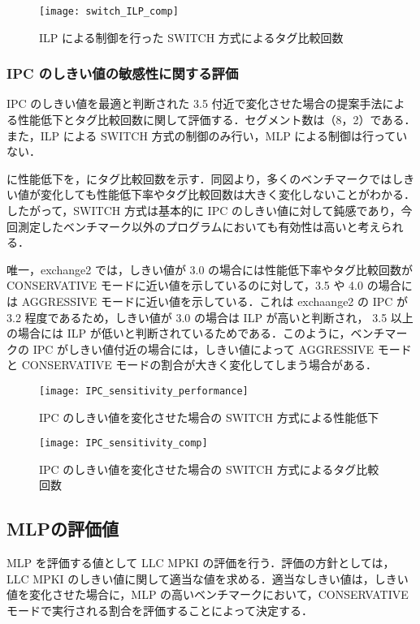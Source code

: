 \begin{figure}[htb]
  \centering
  \texttt{[image: switch\_ILP\_comp]}
  \caption{ILP による制御を行った SWITCH 方式によるタグ比較回数}
  \label{fig:switch_ILP_comp}
\end{figure}

\subsubsection{IPC のしきい値の敏感性に関する評価}
IPC のしきい値を最適と判断された 3.5 付近で変化させた場合の提案手法による性能低下とタグ比較回数に関して評価する．セグメント数は（8，2）である．また，ILP による SWITCH 方式の制御のみ行い，MLP による制御は行っていない．

に性能低下を，にタグ比較回数を示す．同図より，多くのベンチマークではしきい値が変化しても性能低下率やタグ比較回数は大きく変化しないことがわかる．したがって，SWITCH 方式は基本的に IPC のしきい値に対して鈍感であり，今回測定したベンチマーク以外のプログラムにおいても有効性は高いと考えられる．

唯一，exchange2 では，しきい値が 3.0 の場合には性能低下率やタグ比較回数が CONSERVATIVE モードに近い値を示しているのに対して，3.5 や 4.0 の場合には AGGRESSIVE モードに近い値を示している．これは exchaange2 の IPC が 3.2 程度であるため，しきい値が 3.0 の場合は ILP が高いと判断され， 3.5 以上の場合には ILP が低いと判断されているためである．このように，ベンチマークの IPC がしきい値付近の場合には，しきい値によって AGGRESSIVE モードと CONSERVATIVE モードの割合が大きく変化してしまう場合がある．

\begin{figure}[htb]
  \centering
  \texttt{[image: IPC\_sensitivity\_performance]}
  \caption{IPC のしきい値を変化させた場合の SWITCH 方式による性能低下}
  \label{fig:IPC_sensitivity_performance}
\end{figure}

\begin{figure}[htb]
  \centering
  \texttt{[image: IPC\_sensitivity\_comp]}
  \caption{IPC のしきい値を変化させた場合の SWITCH 方式によるタグ比較回数}
  \label{fig:IPC_sensitivity_comp}
\end{figure}

\clearpage

\subsection{MLPの評価値}
MLP を評価する値として LLC MPKI の評価を行う．評価の方針としては，LLC MPKI のしきい値に関して適当な値を求める．適当なしきい値は，しきい値を変化させた場合に，MLP の高いベンチマークにおいて，CONSERVATIVE モードで実行される割合を評価することによって決定する．


